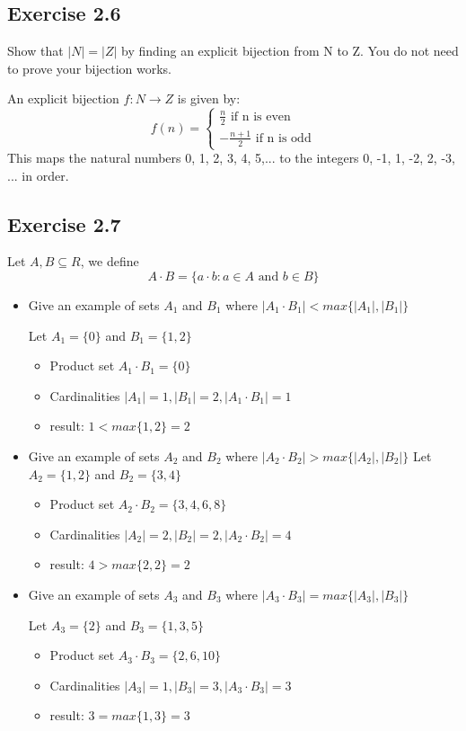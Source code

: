 \documentclass[12pt]{article}
\begin{document}
		\subsection*{Exercise 2.6}
			Show that $|N| = |Z|$ by finding an explicit bijection from N to Z. You do not need to prove your bijection works.
			
			An explicit bijection $f:N \rightarrow Z$ is given by:
			\begin{equation}
				f(n) = \left\{
				\begin{aligned}
					\frac{n}{2} \text{ if n is even} \\
					-\frac{n+1}{2} \text{ if n is odd}
				\end{aligned}
				\right.
			\end{equation}
			This maps the natural numbers 0, 1, 2, 3, 4, 5,... to the integers 0, -1, 1, -2, 2, -3, ... in order.
		\subsection*{Exercise 2.7}
			Let $A,B \subseteq R$, we define
			\begin{equation}
				A \cdot B = \{a \cdot b: a \in A \text{ and } b \in B\}
			\end{equation}
			\begin{itemize}
				\item Give an example of sets $A_1$ and $B_1$ where $|A_1 \cdot B_1| < max\{|A_1|, |B_1|\}$
				
					Let $A_1 = \{0\}$ and $B_1 = \{1,2\}$
					\begin{itemize}
						\item Product set $A_1 \cdot B_1 = \{0\}$
						\item Cardinalities $|A_1|=1, |B_1|=2, |A_1 \cdot B_1|=1$
						\item result: $1 < max\{1,2\} = 2$
					\end{itemize}
				
				\item Give an example of sets $A_2$ and $B_2$ where $|A_2 \cdot B_2| > max\{|A_2|, |B_2|\}$
					Let $A_2 = \{1,2\}$ and $B_2 = \{3,4\}$
					\begin{itemize}
						\item Product set $A_2 \cdot B_2 = \{3,4,6,8\}$
						\item Cardinalities $|A_2|=2, |B_2|=2, |A_2 \cdot B_2|=4$
						\item result: $4 > max\{2,2\} = 2$
					\end{itemize}
				
				\item Give an example of sets $A_3$ and $B_3$ where $|A_3 \cdot B_3| = max\{|A_3|, |B_3|\}$
					
					Let $A_3 = \{2\}$ and $B_3 = \{1,3,5\}$
					\begin{itemize}
						\item Product set $A_3 \cdot B_3 = \{2,6,10\}$
						\item Cardinalities $|A_3|=1, |B_3|=3, |A_3 \cdot B_3|=3$
						\item result: $3 = max\{1,3\} = 3$
					\end{itemize}
			\end{itemize}
\end{document}
